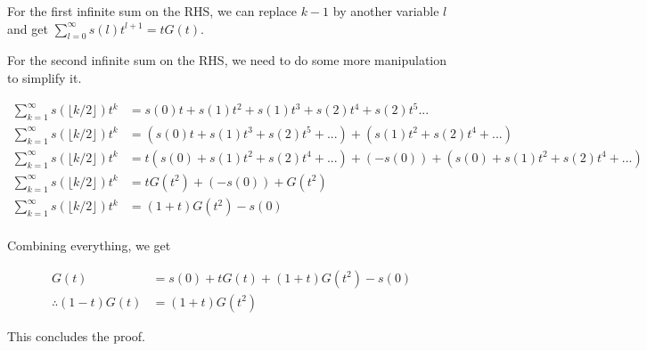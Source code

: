 \documentclass{article}
\begin{document}
For the first infinite sum on the RHS, we can replace $k - 1$ by another variable $l$ and get $\sum_{l = 0}^\infty s(l)t^{l + 1} = tG(t)$.

For the second infinite sum on the RHS, we need to do some more manipulation to simplify it.

\begin{align*}
    \sum_{k = 1}^\infty s(\lfloor {k / 2} \rfloor)t^k &= s(0)t + s(1)t^2 + s(1)t^3 + s(2)t^4 + s(2)t^5 ... \\
    \sum_{k = 1}^\infty s(\lfloor {k / 2} \rfloor)t^k &= (s(0)t + s(1)t^3 + s(2)t^5 + ...) + (s(1)t^2 + s(2)t^4 + ...) \\
    \sum_{k = 1}^\infty s(\lfloor {k / 2} \rfloor)t^k &= t(s(0) + s(1)t^2 + s(2)t^4 + ...) + (-s(0)) + (s(0) + s(1)t^2 + s(2)t^4 + ...) \\
    \sum_{k = 1}^\infty s(\lfloor {k / 2} \rfloor)t^k &= tG(t^2) + (-s(0)) + G(t^2) \\
    \sum_{k = 1}^\infty s(\lfloor {k / 2} \rfloor)t^k &= (1 + t)G(t^2) -s(0) \\
\end{align*}

Combining everything, we get

\begin{align*}
    G(t) &= s(0) + tG(t) + (1 + t)G(t^2) - s(0) \\
    \therefore (1 - t)G(t) &= (1 + t)G(t^2)
\end{align*}

This concludes the proof.
\end{document}
